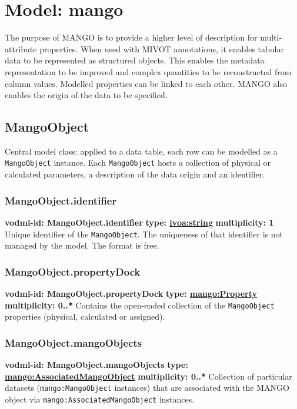 \pagebreak

\section{Model: mango}
    The purpose of MANGO is to provide a higher level of description for multi-attribute properties. When used with MIVOT annotations, it enables tabular data to be represented as structured objects. This enables the metadata representation to be improved and complex quantities to be reconstructed from column values. Modelled properties can be linked to each other. MANGO also enables the origin of the data to be specified.

  \subsection{MangoObject}
    \label{sect:MangoObject}
    Central model class: applied to a data table, each row can be modelled as a \texttt{MangoObject} instance. Each \texttt{MangoObject} hosts a collection of physical or calculated parameters, a description of the data origin and an identifier.

    \subsubsection{MangoObject.identifier}
    \textbf{vodml-id: MangoObject.identifier} \newline
    \textbf{type: \hyperref[sect:ivoa]{ivoa:string}} \newline
    \textbf{multiplicity: 1} \newline
    Unique identifier of the \texttt{MangoObject}. The uniqueness of that identifier is not managed by the model. The format is free.

    \subsubsection{MangoObject.propertyDock}
    \textbf{vodml-id: MangoObject.propertyDock} \newline
    \textbf{type: \hyperref[sect:Property]{mango:Property}} \newline
    \textbf{multiplicity: 0..*} \newline
    Contains the open-ended collection of the \texttt{MangoObject} properties (physical, calculated or assigned).

    \subsubsection{MangoObject.mangoObjects}
    \textbf{vodml-id: MangoObject.mangoObjects} \newline
    \textbf{type: \hyperref[sect:AssociatedMangoObject]{mango:AssociatedMangoObject}} \newline
    \textbf{multiplicity: 0..*} \newline
    Collection of particular datasets (\texttt{mango:MangoObject} instances) that are associated with the MANGO object via \texttt{mango:AssociatedMangoObject} instances.

